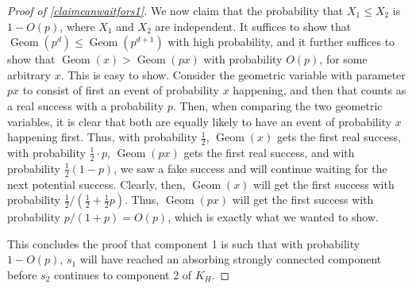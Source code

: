 \documentclass[11pt]{amsart}
\theoremstyle{definition}
\theoremstyle{remark}
\begin{document}
\begin{proof}[Proof of \cref{claimcanwaitfors1}]
        We now claim that the probability that $X_1 \leq X_2$ is $1 - O(p)$, where $X_1$ and $X_2$ are independent. It suffices to show that $\operatorname{Geom}(p^d) \leq \operatorname{Geom}(p^{d+1})$ with high probability, and it further suffices to show that $\operatorname{Geom}(x) > \operatorname{Geom}(px)$ with probability $O(p)$, for some arbitrary $x$. This is easy to show. Consider the geometric variable with parameter $px$ to consist of first an event of probability $x$ happening, and then that counts as a real success with a probability $p$. Then, when comparing the two geometric variables, it is clear that both are equally likely to have an event of probability $x$ happening first. Thus, with probability $\frac{1}{2}$, $\operatorname{Geom}(x)$ gets the first real success, with probability $\frac{1}{2} \cdot p$, $\operatorname{Geom}(px)$ gets the first real success, and with probability $\frac{1}{2} (1 - p)$, we saw a fake success and will continue waiting for the next potential success. Clearly, then, $\operatorname{Geom}(x)$ will get the first success with probability $\frac{1}{2} / (\frac{1}{2} + \frac{1}{2}p)$. Thus, $\operatorname{Geom}(px)$ will get the first success with probability $p / (1 + p) = O(p)$, which is exactly what we wanted to show.

        This concludes the proof that component 1 is such that with probability $1 - O(p)$, $s_1$ will have reached an absorbing strongly connected component before $s_2$ continues to component 2 of $K_H$.
      \end{proof}
\end{document}
